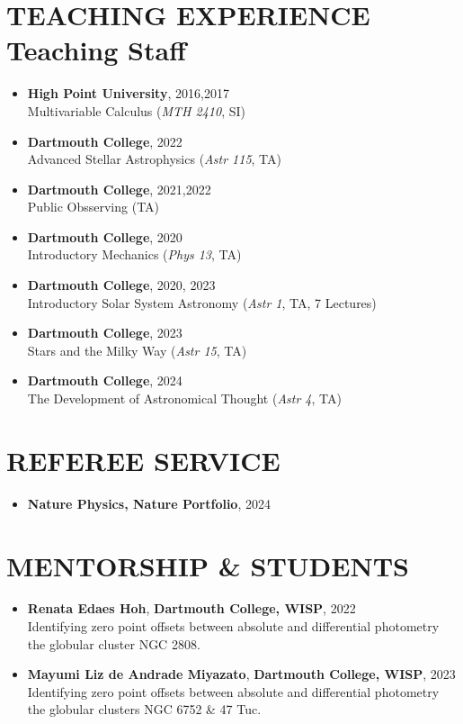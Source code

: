 \documentclass[margin, 10pt]{res} %
\begin{document}
\begin{resume}
\section{TEACHING EXPERIENCE\\Teaching Staff}
\begin{itemize}
	\item {\scriptsize \textbf{High Point University}}, {\small 2016,2017} \\ Multivariable Calculus (\textit{MTH 2410}, SI)
	\item {\scriptsize \textbf{Dartmouth College}}, {\small 2022} \\ Advanced Stellar Astrophysics (\textit{Astr 115}, TA)
	\item {\scriptsize \textbf{Dartmouth College}}, {\small 2021,2022} \\ Public Obsserving (TA)
	\item {\scriptsize \textbf{Dartmouth College}}, {\small 2020} \\ Introductory Mechanics (\textit{Phys 13}, TA)
	\item {\scriptsize \textbf{Dartmouth College}}, {\small 2020, 2023} \\ Introductory Solar System Astronomy (\textit{Astr 1}, TA, 7 Lectures)
	\item {\scriptsize \textbf{Dartmouth College}}, {\small 2023} \\ Stars and the Milky Way (\textit{Astr 15}, TA)
	\item {\scriptsize \textbf{Dartmouth College}}, {\small 2024} \\ The Development of Astronomical Thought (\textit{Astr 4}, TA)
\end{itemize}

\section{REFEREE SERVICE}
\begin{itemize}
  \item {\scriptsize \textbf{Nature Physics, Nature Portfolio}}, {\small 2024}
\end{itemize}

\section{MENTORSHIP \& STUDENTS}
\begin{itemize}
	\item \textbf{Renata Edaes Hoh}, {\scriptsize \textbf{Dartmouth College, WISP}}, {\small 2022} \\ Identifying zero point offsets between absolute and differential photometry the globular cluster NGC 2808.
	\item \textbf{Mayumi Liz de Andrade Miyazato}, {\scriptsize \textbf{Dartmouth College, WISP}}, {\small 2023} \\ Identifying zero point offsets between absolute and differential photometry the globular clusters NGC 6752 \& 47 Tuc.
\end{itemize}



\end{resume}
\end{document}

